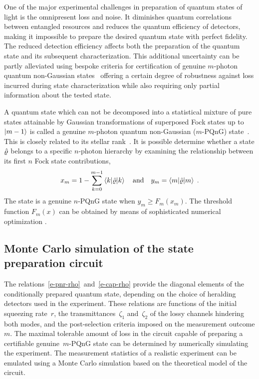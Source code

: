 \documentclass{article}
\begin{document}
One of the major experimental challenges in preparation of quantum states of light is the omnipresent loss and noise. It diminishes quantum correlations between entangled resources and reduces the quantum efficiency of detectors, making it impossible to prepare the desired quantum state with perfect fidelity. The reduced detection efficiency affects both the preparation of the quantum state and its subsequent characterization. This additional uncertainty can be partly alleviated using bespoke criteria for certification of genuine $m$-photon quantum non-Gaussian states~\cite{lachman2019} offering a certain degree of robustness against loss incurred during state characterization while also requiring only partial information about the tested state.

A quantum state which can not be decomposed into a statistical mixture of pure states attainable by Gaussian transformations of superposed Fock states up to ${\ket{m - 1}}$ is called a genuine $m$-photon quantum non-Gaussian ($m$-PQnG) state~\cite{lachman2019}. This is closely related to its stellar rank~\cite{chabaud2020,fiurasek2022}. It is possible determine whether a state $\hat{\varrho}$ belongs to a specific $n$-photon hierarchy by examining the relationship between its first $n$ Fock state contributions,
%
\begin{equation}
  x_{m} 
    = 1 - \sum_{k = 0}^{m - 1} 
      \braket{k | \hat{\varrho} | k}
  \quad\text{and}\quad
  y_{m} = \braket{m | \hat{\varrho} | m}
  \;\text{.}
\end{equation}
%
The state is a genuine $n$-PQnG state when ${y_{m} \geq F_{m} (x_{m})}$. The threshold function $F_{m}(x)$ can be obtained by means of sophisticated numerical optimization \cite{lachman2019,fiurasek2022}.

%
%

\subsection*{Monte Carlo simulation of the state preparation circuit}

The relations~\eqref{e-pnr-rho}~and~\eqref{e-cap-rho} provide the diagonal elements of the conditionally prepared quantum state, depending on the choice of heralding detectors used in the experiment. These relations are functions of the initial squeezing rate~$r$, the transmittances~$\zeta_{1}$ and~$\zeta_{2}$ of the lossy channels hindering both modes, and the post-selection criteria imposed on the measurement outcome $m$. The maximal tolerable amount of loss in the circuit capable of preparing a certifiable genuine~$m$-PQnG state can be determined by numerically simulating the experiment. The measurement statistics of a realistic experiment can be emulated using a Monte Carlo simulation based on the theoretical model of the circuit. 
\end{document}
